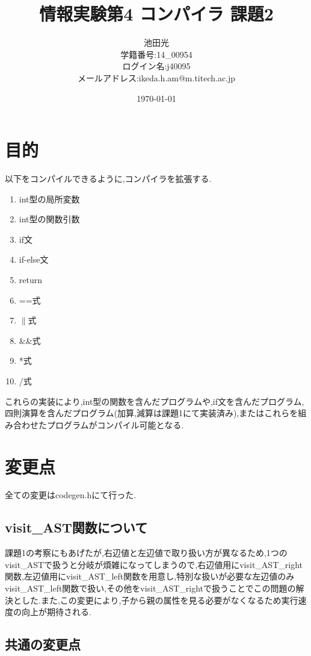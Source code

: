 \documentclass[10pt]{jsarticle}
\begin{document}
\begin{titlepage}
\title{情報実験第4 コンパイラ 課題2}
\date{\today}
\author{池田光 \\ 学籍番号:14\_00954 \\ ログイン名:j40095 \\メールアドレス:ikeda.h.am@m.titech.ac.jp}
\maketitle
\thispagestyle{empty}
\end{titlepage}

\section{目的}
以下をコンパイルできるように,コンパイラを拡張する.
\begin{enumerate}
  \item int型の局所変数
  \item int型の関数引数
  \item if文
  \item if-else文
  \item return
  \item ==式
  \item $\parallel$式
  \item \&\&式
  \item *式
  \item /式
\end{enumerate}
これらの実装により,int型の関数を含んだプログラムや,if文を含んだプログラム,四則演算を含んだプログラム(加算,減算は課題1にて実装済み),またはこれらを組み合わせたプログラムがコンパイル可能となる.

\section{変更点}
全ての変更はcodegen.hにて行った.

\subsection{visit\_AST関数について}
課題1の考察にもあげたが,右辺値と左辺値で取り扱い方が異なるため,1つのvisit\_ASTで扱うと分岐が煩雑になってしまうので,右辺値用にvisit\_AST\_right関数,左辺値用にvisit\_AST\_left関数を用意し,特別な扱いが必要な左辺値のみvisit\_AST\_left関数で扱い,その他をvisit\_AST\_rightで扱うことでこの問題の解決とした.また,この変更により,子から親の属性を見る必要がなくなるため実行速度の向上が期待される.
\subsection{共通の変更点}
\end{document}
